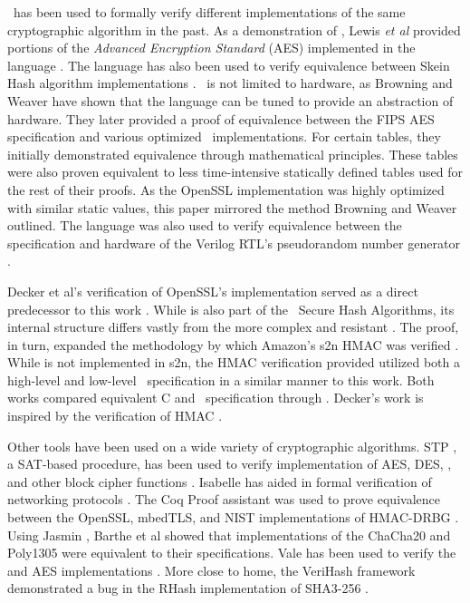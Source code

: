 \cryptol\ has been used to formally verify different implementations of the same cryptographic algorithm in the past.
As a demonstration of \cryptol, Lewis \emph{et al} provided portions of the \emph{Advanced Encryption Standard} (AES) implemented in the language \cite{crypt-hi}.
The language has also been used to verify equivalence between Skein Hash algorithm implementations \cite{hard-soft}.
\cryptol\ is not limited to hardware, as Browning and Weaver \cite{design-verif} have shown that the language can be tuned to provide an abstraction of hardware.
They later provided a proof of equivalence between the FIPS AES specification and various optimized \cryptol\ implementations.
For certain tables, they initially demonstrated equivalence through mathematical principles.
These tables were also proven equivalent to less time-intensive statically defined tables used for the rest of their proofs.
As the OpenSSL implementation was highly optimized with similar static values, this paper mirrored the method Browning and Weaver outlined.
The language was also used to verify equivalence between the specification and hardware of the Verilog RTL's pseudorandom number generator \cite{pseudorandom}.

Decker et al's verification of OpenSSL's  implementation served as a direct predecessor to this work \cite{nfm-us}.
While \shaTwo is also part of the \nist\ Secure Hash Algorithms, its internal structure differs vastly from the more complex and resistant \shaThree.
The \shaTwo proof, in turn, expanded the methodology by which Amazon's s2n HMAC was verified \cite{chudov,s2n-blog}.
While \shaThree is not implemented in s2n, the HMAC verification provided utilized both a high-level and low-level \cryptol\ specification in a similar manner to this work.
Both works compared equivalent C and \cryptol\ specification through \saw.
Decker's work is inspired by the \openssl verification of HMAC \cite{beringer}.

Other tools have been used on a wide variety of cryptographic algorithms.
STP \cite{stp}, a SAT-based procedure, has been used to verify implementation of AES, DES, \shaOne, and other block cipher functions \cite{auto}.
Isabelle \cite{isabelle} has aided in formal verification of networking protocols \cite{formal-protocols}.
The Coq \cite{coq} Proof assistant was used to prove equivalence between the OpenSSL, mbedTLS, and NIST implementations of HMAC-DRBG \cite{verified-correctness}.
Using Jasmin \cite{jasmin}, Barthe et al \cite{hi-assurance} showed that implementations of the ChaCha20 and Poly1305 were equivalent to their specifications.
Vale has been used to verify the  and AES implementations \cite{vale}.
More close to home, the VeriHash framework demonstrated a bug in the RHash \cite{rhash} implementation of SHA3-256 \cite{hash-functions}.
